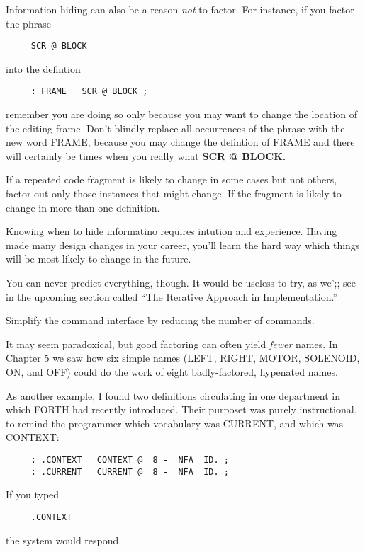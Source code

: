 Information hiding can also be a reason \textit{not} to factor. For instance, if you factor the phrase

\begin{verbatim}
     SCR @ BLOCK
\end{verbatim}
into the defintion

\begin{verbatim}
     : FRAME   SCR @ BLOCK ;
\end{verbatim}
remember you are doing so only because you may want to change the location of the editing frame. Don't blindly replace all occurrences of the phrase with the new word FRAME, because you may change the defintion of FRAME and there will certainly be times when you really wnat \textbf{SCR @ BLOCK.}

\begin{tip}
If a repeated code fragment is likely to change in some cases but not others, factor out only those instances that might change. If the fragment is likely to change in more than one definition.
\end{tip}
Knowing when to hide informatino requires intution and experience. Having made many design changes in your career, you'll learn the hard way which things will be most likely to change in the future.

You can never predict everything, though. It would be useless to try, as we';; see in the upcoming section called ``The Iterative Approach in Implementation.''

\begin{tip}
Simplify the command interface by reducing the number of commands.
\end{tip}
It may seem paradoxical, but good factoring can often yield \textit{fewer} names. In Chapter 5 we saw how six simple names (LEFT, RIGHT, MOTOR, SOLENOID, ON, and OFF) could do the work of eight badly-factored, hypenated names.

As another example, I found two definitions circulating in one department in which FORTH had recently introduced. Their purposet was purely instructional, to remind the programmer which vocabulary was CURRENT, and which was CONTEXT:

\begin{verbatim}
     : .CONTEXT   CONTEXT @  8 -  NFA  ID. ;
     : .CURRENT   CURRENT @  8 -  NFA  ID. ;
\end{verbatim}
If you typed

\begin{verbatim}
     .CONTEXT
\end{verbatim}
the system would respond


